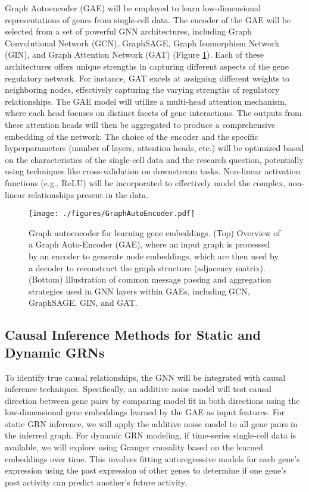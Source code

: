 Graph Autoencoder (GAE) \cite{velivckovic2017graph,pan2018adversarially} will be employed to learn low-dimensional representations of genes from single-cell data. The encoder of the GAE will be selected from a set of powerful GNN architectures, including Graph Convolutional Network (GCN), GraphSAGE, Graph Isomorphism Network (GIN), and Graph Attention Network (GAT) \cite{hamilton2017inductive,kipf2016semi,velivckovic2017graph,xu2018powerful} (Figure \ref{fig:architectures}). Each of these architectures offers unique strengths in capturing different aspects of the gene regulatory network. For instance, GAT excels at assigning different weights to neighboring nodes, effectively capturing the varying strengths of regulatory relationships. The GAE model will utilize a multi-head attention mechanism, where each head focuses on distinct facets of gene interactions. The outputs from these attention heads will then be aggregated to produce a comprehensive embedding of the network. The choice of the encoder and the specific hyperparameters (number of layers, attention heads, etc.) will be optimized based on the characteristics of the single-cell data and the research question, potentially using techniques like cross-validation on downstream tasks. Non-linear activation functions (e.g., ReLU) will be incorporated to effectively model the complex, non-linear relationships present in the data.

\begin{figure}[htbp]
    \centering
    \texttt{[image: ./figures/GraphAutoEncoder.pdf]}
    \caption{
        Graph autoencoder for learning gene embeddings. (Top) Overview of a Graph Auto-Encoder (GAE), where an input graph is processed by an encoder to generate node embeddings, which are then used by a decoder to reconstruct the graph structure (adjacency matrix). (Bottom) Illustration of common message passing and aggregation strategies used in GNN layers within GAEs, including GCN, GraphSAGE, GIN, and GAT.
    }
    \label{fig:architectures}
\end{figure}


\subsection{Causal Inference Methods for Static and Dynamic GRNs}
To identify true causal relationships, the GNN will be integrated with causal inference techniques. Specifically, an additive noise model \cite{feng2023gene} will test causal direction between gene pairs by comparing model fit in both directions using the low-dimensional gene embeddings learned by the GAE as input features. For static GRN inference, we will apply the additive noise model to all gene pairs in the inferred graph. For dynamic GRN modeling, if time-series single-cell data is available, we will explore using Granger causality based on the learned embeddings over time. This involves fitting autoregressive models for each gene's expression using the past expression of other genes to determine if one gene's past activity can predict another's future activity.

